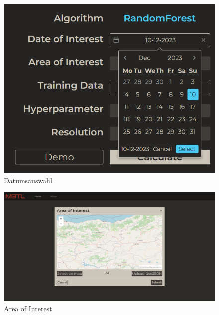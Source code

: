 \begin{figure}[H]
\centering
\includegraphics[scale=0.8]{Abbildungen/web-date-picker.png}
\caption{Datumsauswahl}
\label{fig:datepicker}
\end{figure}

\begin{landscape}
\thispagestyle{empty}
    \begin{figure}[H]
    \centering
    \includegraphics[scale=0.5]{Abbildungen/web-aoi.png}
    \caption{Area of Interest}
    \label{fig:aoi-modal}
\end{figure}
\end{landscape}